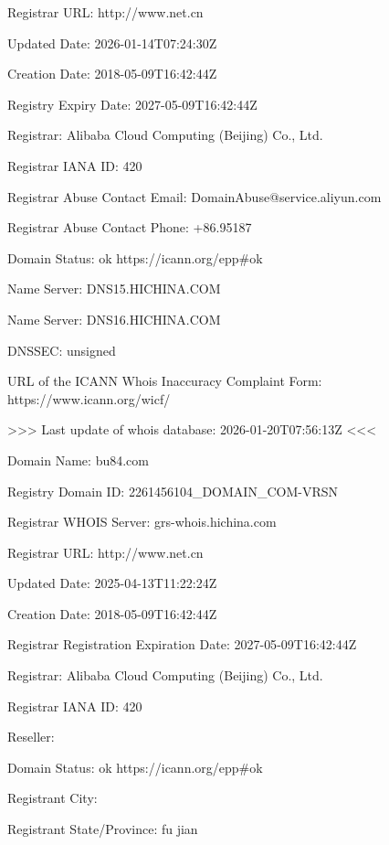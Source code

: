 \documentclass[
]{article}
\newenvironment{Shaded}{}{}
\newcommand{\NormalTok}[1]{#1}
\begin{document}
\begin{Shaded}
\begin{Highlighting}[]
\NormalTok{   Registrar URL: http://www.net.cn}

\NormalTok{   Updated Date: 2026{-}01{-}14T07:24:30Z}

\NormalTok{   Creation Date: 2018{-}05{-}09T16:42:44Z}

\NormalTok{   Registry Expiry Date: 2027{-}05{-}09T16:42:44Z}

\NormalTok{   Registrar: Alibaba Cloud Computing (Beijing) Co., Ltd.}

\NormalTok{   Registrar IANA ID: 420}

\NormalTok{   Registrar Abuse Contact Email: DomainAbuse@service.aliyun.com}

\NormalTok{   Registrar Abuse Contact Phone: +86.95187}

\NormalTok{   Domain Status: ok https://icann.org/epp\#ok}

\NormalTok{   Name Server: DNS15.HICHINA.COM}

\NormalTok{   Name Server: DNS16.HICHINA.COM}

\NormalTok{   DNSSEC: unsigned}

\NormalTok{   URL of the ICANN Whois Inaccuracy Complaint Form: https://www.icann.org/wicf/}

\NormalTok{\textgreater{}\textgreater{}\textgreater{} Last update of whois database: 2026{-}01{-}20T07:56:13Z \textless{}\textless{}\textless{}}

\NormalTok{Domain Name: bu84.com}

\NormalTok{Registry Domain ID: 2261456104\_DOMAIN\_COM{-}VRSN}

\NormalTok{Registrar WHOIS Server: grs{-}whois.hichina.com}

\NormalTok{Registrar URL: http://www.net.cn}

\NormalTok{Updated Date: 2025{-}04{-}13T11:22:24Z}

\NormalTok{Creation Date: 2018{-}05{-}09T16:42:44Z}

\NormalTok{Registrar Registration Expiration Date: 2027{-}05{-}09T16:42:44Z}

\NormalTok{Registrar: Alibaba Cloud Computing (Beijing) Co., Ltd.}

\NormalTok{Registrar IANA ID: 420}

\NormalTok{Reseller:}

\NormalTok{Domain Status: ok https://icann.org/epp\#ok}

\NormalTok{Registrant City:}

\NormalTok{Registrant State/Province: fu jian}


\end{Highlighting}
\end{Shaded}
\end{document}
